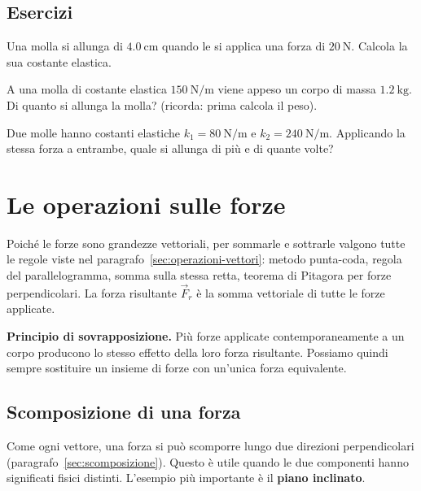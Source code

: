 \subsection{Esercizi}

\begin{esercizio}
Una molla si allunga di $\SI{4,0}{\centi\meter}$ quando le si applica una forza di $\SI{20}{\newton}$. Calcola la sua costante elastica.\\
\end{esercizio}

\begin{esercizio}
A una molla di costante elastica $\SI{150}{\newton\per\meter}$ viene appeso un corpo di massa $\SI{1,2}{\kilo\gram}$. Di quanto si allunga la molla? (ricorda: prima calcola il peso).\\
\end{esercizio}

\begin{esercizio}
Due molle hanno costanti elastiche $k_1 = \SI{80}{\newton\per\meter}$ e $k_2 = \SI{240}{\newton\per\meter}$. Applicando la stessa forza a entrambe, quale si allunga di più e di quante volte?\\
\end{esercizio}


\section{Le operazioni sulle forze}

Poiché le forze sono grandezze vettoriali, per sommarle e sottrarle valgono tutte le regole viste nel paragrafo~\ref{sec:operazioni-vettori}: metodo punta-coda, regola del parallelogramma, somma sulla stessa retta, teorema di Pitagora per forze perpendicolari. La forza risultante $\vec{F}_r$ è la somma vettoriale di tutte le forze applicate.

\begin{remark}
\textbf{Principio di sovrapposizione.} Più forze applicate contemporaneamente a un corpo producono lo stesso effetto della loro forza risultante. Possiamo quindi sempre sostituire un insieme di forze con un'unica forza equivalente.
\end{remark}

\subsection{Scomposizione di una forza}
Come ogni vettore, una forza si può scomporre lungo due direzioni perpendicolari (paragrafo~\ref{sec:scomposizione}). Questo è utile quando le due componenti hanno significati fisici distinti. L'esempio più importante è il \textbf{piano inclinato}.

